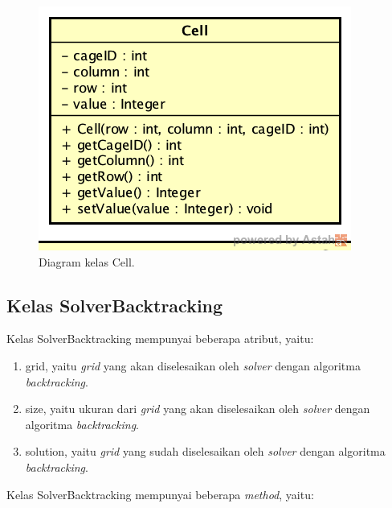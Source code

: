 \begin{figure}
\centering
\captionsetup{justification=centering}
\includegraphics[scale=0.5]{Gambar/Perancangan/DiagramKelasCell.png}
\caption[Diagram kelas Cell.]{Diagram kelas Cell.}
\label{fig:diagramkelascell}
\end{figure}

\subsection{Kelas SolverBacktracking}
\label{sec:kelassolverbt}

Kelas SolverBacktracking mempunyai beberapa atribut, yaitu:

\begin{enumerate}
\item grid, yaitu \textit{grid} yang akan diselesaikan oleh \textit{solver} dengan algoritma \textit{backtracking}.
\item size, yaitu ukuran dari \textit{grid} yang akan diselesaikan oleh \textit{solver} dengan algoritma \textit{backtracking}.
\item solution, yaitu \textit{grid} yang sudah diselesaikan oleh \textit{solver} dengan algoritma \textit{backtracking}.
\end{enumerate}

Kelas SolverBacktracking mempunyai beberapa \textit{method}, yaitu:

